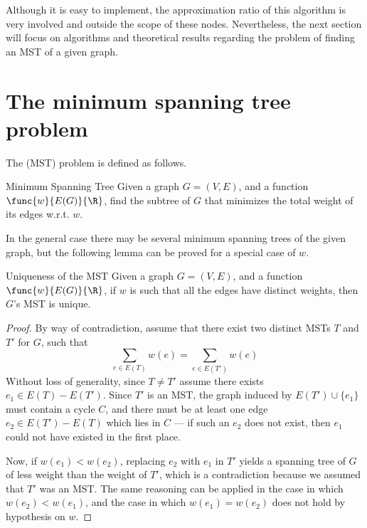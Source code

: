 \documentclass[a4paper, 12pt]{report}
\begin{document}
    Although it is easy to implement, the approximation ratio of this algorithm is very involved and outside the scope of these nodes. Nevertheless, the next section will focus on algorithms and theoretical results regarding the problem of finding an MST of a given graph.

    \section{The minimum spanning tree problem}

    The  (MST) problem is defined as follows.

    \begin{frameddefn}{Minimum Spanning Tree}
        Given a graph $G = (V, E)$, and a function $\func{w}{E(G)}{\R}$, find the subtree of $G$ that minimizes the total weight of its edges w.r.t. $w$.
    \end{frameddefn}

    In the general case there may be several minimum spanning trees of the given graph, but the following lemma can be proved for a special case of $w$.

    \begin{framedlem}{Uniqueness of the MST}
        Given a graph $G = (V, E)$, and a function $\func{w}{E(G)}{\R}$, if $w$ is such that all the edges have distinct weights, then $G$'s MST is unique.
    \end{framedlem}

    \begin{proof}
        By way of contradiction, assume that there exist two distinct MSTs $T$ and $T'$ for $G$, such that $$\sum_{e \in E(T)}{w(e)} = \sum_{e \in E(T')}{w(e)}$$ Without loss of generality, since $T \neq T'$ assume there exists $e_1 \in E(T) - E(T')$. Since $T'$ is an MST, the graph induced by $E(T') \cup \{e_1\}$ must contain a cycle $C$, and there must be at least one edge $e_2 \in E(T') - E(T)$ which lies in $C$ --- if such an $e_2$ does not exist, then $e_1$ could not have existed in the first place.

        Now, if $w(e_1) < w(e_2)$, replacing $e_2$ with $e_1$ in $T'$ yields a spanning tree of $G$ of less weight than the weight of $T'$, which is a contradiction because we assumed that $T'$ was an MST. The same reasoning can be applied in the case in which $w(e_2) < w(e_1)$, and the case in which $w(e_1) = w(e_2)$ does not hold by hypothesis on $w$.
    \end{proof}
\end{document}
